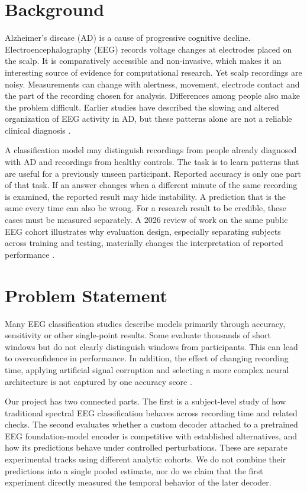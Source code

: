 \section{Background}
Alzheimer's disease (AD) is a cause of progressive cognitive decline. Electroencephalography (EEG) records voltage changes at electrodes placed on the scalp. It is comparatively accessible and non-invasive, which makes it an interesting source of evidence for computational research. Yet scalp recordings are noisy. Measurements can change with alertness, movement, electrode contact and the part of the recording chosen for analysis. Differences among people also make the problem difficult. Earlier studies have described the slowing and altered organization of EEG activity in AD, but these patterns alone are not a reliable clinical diagnosis \cite{jeong2004,dauwels2010,cassani2018}.

A classification model may distinguish recordings from people already diagnosed with AD and recordings from healthy controls. The task is to learn patterns that are useful for a previously unseen participant. Reported accuracy is only one part of that task. If an answer changes when a different minute of the same recording is examined, the reported result may hide instability. A prediction that is the same every time can also be wrong. For a research result to be credible, these cases must be measured separately. A 2026 review of work on the same public EEG cohort illustrates why evaluation design, especially separating subjects across training and testing, materially changes the interpretation of reported performance \cite{miltiadous2026benchmark}.

\section{Problem Statement}
Many EEG classification studies describe models primarily through accuracy, sensitivity or other single-point results. Some evaluate thousands of short windows but do not clearly distinguish windows from participants. This can lead to overconfidence in performance. In addition, the effect of changing recording time, applying artificial signal corruption and selecting a more complex neural architecture is not captured by one accuracy score \cite{varoquaux2018,varma2006}.

Our project has two connected parts. The first is a subject-level study of how traditional spectral EEG classification behaves across recording time and related checks. The second evaluates whether a custom decoder attached to a pretrained EEG foundation-model encoder is competitive with established alternatives, and how its predictions behave under controlled perturbations. These are separate experimental tracks using different analytic cohorts. We do not combine their predictions into a single pooled estimate, nor do we claim that the first experiment directly measured the temporal behavior of the later decoder.


